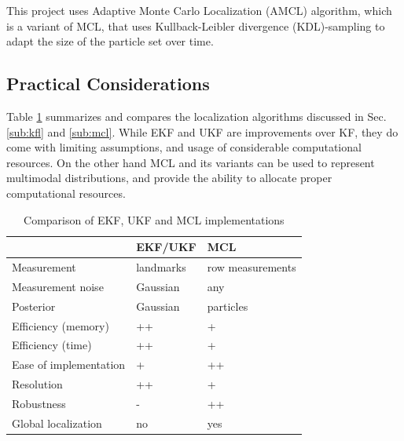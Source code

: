 \documentclass[10pt,journal,compsoc]{IEEEtran}
\begin{document}
This project uses Adaptive Monte Carlo Localization  (AMCL) algorithm, which is a variant of MCL, that uses Kullback-Leibler divergence (KDL)-sampling to adapt the size of the particle set over time. 

\subsection{Practical Considerations}

Table \ref{tab:comp} summarizes and compares the localization algorithms discussed in Sec. \ref{sub:kfl} and \ref{sub:mcl}. While EKF and UKF are improvements over KF, they do come with limiting assumptions, and usage of considerable computational resources. On the other hand MCL and its variants can be used to represent multimodal distributions, and provide the ability to allocate proper computational resources.    

\begin{table}[h]
\caption{Comparison of EKF, UKF and MCL implementations}
\label{tab:comp}
\begin{center}
\begin{tabular}{|l||l|l|}
\hline
& EKF/UKF & MCL\\
\hline
Measurement & landmarks & row measurements\\
Measurement noise  & Gaussian & any\\
Posterior & Gaussian & particles\\
Efficiency (memory) & ++ &+\\
Efficiency (time) & ++ & +\\
Ease of implementation & + & ++\\
Resolution & ++ & +\\
Robustness & - & ++\\
Global localization & no & yes\\
\hline
\end{tabular}
\end{center}
\end{table}




%
%



%
\end{document}
